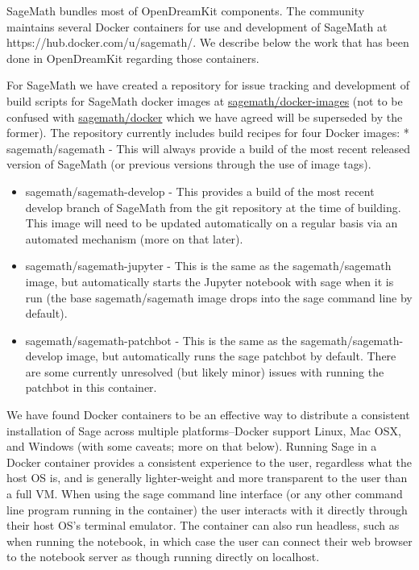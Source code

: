 SageMath bundles most of OpenDreamKit components. The community
maintains several Docker containers for use and development of SageMath
at https://hub.docker.com/u/sagemath/. We describe below the work that
has been done in OpenDreamKit regarding those containers.

For SageMath we have created a repository for issue tracking and
development of build scripts for SageMath docker images at
\href{https://github.com/sagemath/docker-images}{sagemath/docker-images}
(not to be confused with
\href{https://github.com/sagemath/docker/}{sagemath/docker} which we
have agreed will be superseded by the former). The repository currently
includes build recipes for four Docker images: * sagemath/sagemath -
This will always provide a build of the most recent released version of
SageMath (or previous versions through the use of image tags).

\begin{itemize}
\item
  sagemath/sagemath-develop - This provides a build of the most recent
  develop branch of SageMath from the git repository at the time of
  building. This image will need to be updated automatically on a
  regular basis via an automated mechanism (more on that later).
\item
  sagemath/sagemath-jupyter - This is the same as the sagemath/sagemath
  image, but automatically starts the Jupyter notebook with sage when it
  is run (the base sagemath/sagemath image drops into the sage command
  line by default).
\item
  sagemath/sagemath-patchbot - This is the same as the
  sagemath/sagemath-develop image, but automatically runs the sage
  patchbot by default. There are some currently unresolved (but likely
  minor) issues with running the patchbot in this container.
\end{itemize}

We have found Docker containers to be an effective way to distribute a
consistent installation of Sage across multiple platforms--Docker
support Linux, Mac OSX, and Windows (with some caveats; more on that
below). Running Sage in a Docker container provides a consistent
experience to the user, regardless what the host OS is, and is generally
lighter-weight and more transparent to the user than a full VM. When
using the sage command line interface (or any other command line program
running in the container) the user interacts with it directly through
their host OS's terminal emulator. The container can also run headless,
such as when running the notebook, in which case the user can connect
their web browser to the notebook server as though running directly on
localhost.

